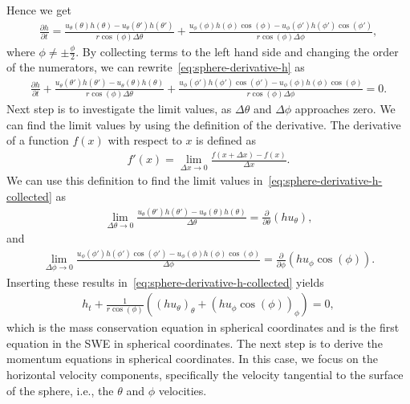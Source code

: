 Hence we get
\begin{align}\label{eq:sphere-derivative-h}
    \frac{\partial h}{\partial t} = \frac{u_\theta(\theta) h(\theta) - u_\theta(\theta ')h(\theta ') }{r \cos(\phi) \Delta \theta} 
    + \frac{u_\phi(\phi) h(\phi)\cos (\phi) - u_\phi (\phi ')h(\phi ') \cos(\phi')}{r \cos (\phi) \Delta \phi},
\end{align}
where $\phi \neq \pm \frac{\phi}{2}$.
By collecting terms to the left hand side and changing the order of the numerators, we can rewrite~\eqref{eq:sphere-derivative-h} as 
\begin{align}\label{eq:sphere-derivative-h-collected}
    \frac{\partial h}{\partial t} + \frac{u_\theta(\theta') h(\theta') - u_\theta(\theta)h(\theta) }{r \cos(\phi) \Delta \theta} 
    + \frac{u_\phi(\phi ')h(\phi ') \cos(\phi') - u_\phi(\phi) h(\phi) \cos(\phi) }{r \cos (\phi) \Delta \phi} = 0.
\end{align}
Next step is to investigate the limit values, as $\Delta \theta$ and $\Delta \phi$ approaches zero.
We can find the limit values by using the definition of the derivative.
The derivative of a function $f(x)$ with respect to $x$ is defined as
\begin{align*}
    f'(x) = \lim_{\Delta x \to 0} \frac{f(x + \Delta x) - f(x)}{\Delta x}.
\end{align*}
We can use this definition to find the limit values in~\eqref{eq:sphere-derivative-h-collected} as
\begin{align*}
    \lim_{\Delta \theta \to 0} \frac{ u_\theta(\theta ')h(\theta ') - u_\theta(\theta) h(\theta) }{\Delta \theta} = \frac{\partial}{\partial \theta} (h u_\theta ),
\end{align*}
and 
\begin{align*}
    \lim_{\Delta \phi \to 0} \frac{ u_\phi(\phi ')h(\phi ') \cos(\phi') - u_\phi(\phi) h(\phi) \cos(\phi) }{\Delta \phi} =  \frac{\partial}{\partial \phi} (h u_\phi \cos(\phi)).
\end{align*}
Inserting these results in~\eqref{eq:sphere-derivative-h-collected} yields
\begin{align*}
    h_t + \frac{1}{r \cos (\phi)} \left( {(h u_\theta)}_{\theta} + {(h u_{\phi} \cos(\phi))}_{\phi}  \right) = 0,
\end{align*}
which is the mass conservation equation in spherical coordinates and is the first equation in the SWE in spherical coordinates.
The next step is to derive the momentum equations in spherical coordinates.
In this case, we focus on the horizontal velocity components, specifically the velocity tangential to the surface of the sphere, i.e., the $\theta$ and $\phi$ velocities.
